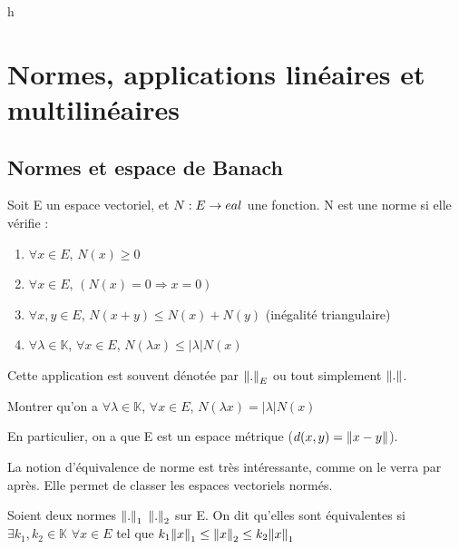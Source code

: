 h\chapter{Normes, applications linéaires et multilinéaires}
\label{chapter:linear_application}



\section{Normes et espace de Banach}

\begin{definition}
    Soit E un espace vectoriel, et $N : E \rightarrow 
eal$ une fonction.
    N est une norme si elle vérifie :
    \begin{enumerate}
        \item $\forall x \in E$, $N(x) \geq 0$
        \item $\forall x \in E$, $(N(x) = 0 \Rightarrow x = 0)$
        \item $\forall x, y \in E$, $N(x + y) \leq N(x) + N(y)$ (inégalité
            triangulaire)
        \item $\forall \lambda \in \mathbb{K}$, $\forall x \in E$, $N(\lambda x)
            \leq |\lambda| N(x)$
    \end{enumerate}
    Cette application est souvent dénotée par $\norm{.}_{E}$ ou tout simplement
    $\norm{.}$.
\end{definition}

\begin{exercice}
    Montrer qu'on a
    $\forall \lambda \in \mathbb{K}$, $\forall x \in E$, $N(\lambda x) =
    |\lambda| N(x)$
\end{exercice}

En particulier, on a que E est un espace métrique ($d(x, y) = \norm{x - y}$).

La notion d'équivalence de norme est très intéressante, comme on le verra par
après. Elle permet de classer les espaces vectoriels normés.

\begin{definition}
    Soient deux normes $\norm{.}_{1}$ $\norm{.}_{2}$ sur E. On dit
	qu'elles sont équivalentes si $\exists k_{1}, k_{2} \in \mathbb{K}$ $\forall
	x \in E$ tel que $k_{1} \norm{x}_{1} \leq \norm{x}_{2} \leq
	k_{2} \norm{x}_{1}$
\end{definition}

